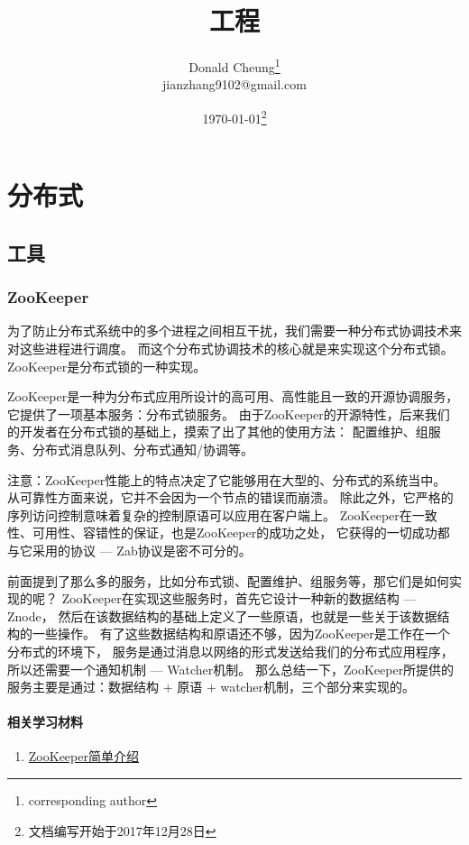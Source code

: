 \documentclass[utf8,a4paper,10pt]{ctexbook}
\title{工程}
\author{Donald Cheung\thanks{corresponding author}\\jianzhang9102@gmail.com}
\date{\today\footnote{文档编写开始于2017年12月28日}}
\begin{document}
\maketitle
\tableofcontents

\chapter{分布式}

\section{工具}

\subsection{ZooKeeper}
为了防止分布式系统中的多个进程之间相互干扰，我们需要一种分布式协调技术来对这些进程进行调度。
而这个分布式协调技术的核心就是来实现这个分布式锁。ZooKeeper是分布式锁的一种实现。

ZooKeeper是一种为分布式应用所设计的高可用、高性能且一致的开源协调服务，
它提供了一项基本服务：分布式锁服务。
由于ZooKeeper的开源特性，后来我们的开发者在分布式锁的基础上，摸索了出了其他的使用方法：
配置维护、组服务、分布式消息队列、分布式通知/协调等。

注意：ZooKeeper性能上的特点决定了它能够用在大型的、分布式的系统当中。
从可靠性方面来说，它并不会因为一个节点的错误而崩溃。
除此之外，它严格的序列访问控制意味着复杂的控制原语可以应用在客户端上。
ZooKeeper在一致性、可用性、容错性的保证，也是ZooKeeper的成功之处，
它获得的一切成功都与它采用的协议 --- Zab协议是密不可分的。

前面提到了那么多的服务，比如分布式锁、配置维护、组服务等，那它们是如何实现的呢？
ZooKeeper在实现这些服务时，首先它设计一种新的数据结构 --- Znode，
然后在该数据结构的基础上定义了一些原语，也就是一些关于该数据结构的一些操作。
有了这些数据结构和原语还不够，因为ZooKeeper是工作在一个分布式的环境下，
服务是通过消息以网络的形式发送给我们的分布式应用程序，所以还需要一个通知机制 --- Watcher机制。
那么总结一下，ZooKeeper所提供的服务主要是通过：数据结构 + 原语 + watcher机制，三个部分来实现的。

\subsubsection{相关学习材料}
\begin{enumerate}
    \item \href{http://www.cnblogs.com/sunddenly/p/4033574.html}{ZooKeeper简单介绍}
\end{enumerate}
\end{document}
